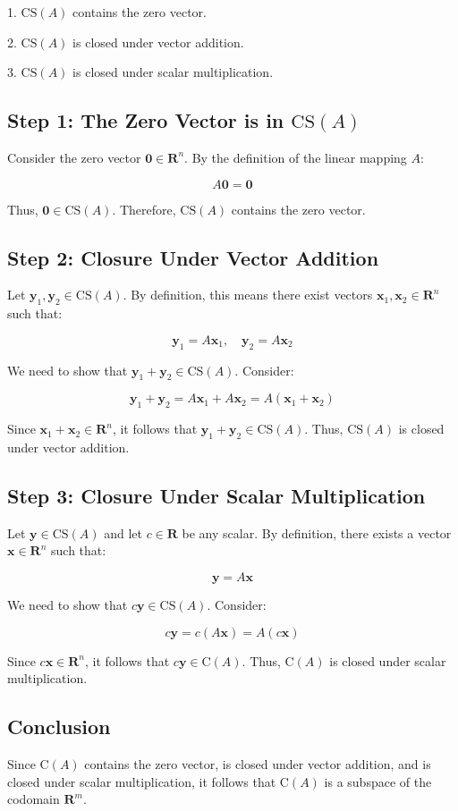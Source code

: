 \documentclass{article}
\begin{document}
1. \( \text{CS}(A) \) contains the zero vector.

2. \( \text{CS}(A) \) is closed under vector addition.

3. \( \text{CS}(A) \) is closed under scalar multiplication.

\subsection{Step 1: The Zero Vector is in \( \text{CS}(A) \)}

Consider the zero vector \( \mathbf{0} \in \mathbf{R}^n \). By the definition of the linear mapping \( A \):

\[
A \mathbf{0} = \mathbf{0}
\]

Thus, \( \mathbf{0} \in \text{CS}(A) \). Therefore, \( \text{CS}(A) \) contains the zero vector.

\subsection{Step 2: Closure Under Vector Addition}

Let \( \mathbf{y}_1, \mathbf{y}_2 \in \text{CS}(A) \). By definition, this means there exist vectors \( \mathbf{x}_1, \mathbf{x}_2 \in \mathbf{R}^n \) such that:

\[
\mathbf{y}_1 = A \mathbf{x}_1, \quad \mathbf{y}_2 = A \mathbf{x}_2
\]

We need to show that \( \mathbf{y}_1 + \mathbf{y}_2 \in \text{CS}(A) \). Consider:

\[
\mathbf{y}_1 + \mathbf{y}_2 = A \mathbf{x}_1 + A \mathbf{x}_2 = A(\mathbf{x}_1 + \mathbf{x}_2)
\]

Since \( \mathbf{x}_1 + \mathbf{x}_2 \in \mathbf{R}^n \), it follows that \( \mathbf{y}_1 + \mathbf{y}_2 \in \text{CS}(A) \). Thus, \( \text{CS}(A) \) is closed under vector addition.

\subsection{Step 3: Closure Under Scalar Multiplication}

Let \( \mathbf{y} \in \text{CS}(A) \) and let \( c \in \mathbf{R} \) be any scalar. By definition, there exists a vector \( \mathbf{x} \in \mathbf{R}^n \) such that:

\[
\mathbf{y} = A \mathbf{x}
\]

We need to show that \( c\mathbf{y} \in \text{CS}(A) \). Consider:

\[
c\mathbf{y} = c(A \mathbf{x}) = A(c\mathbf{x})
\]

Since \( c\mathbf{x} \in \mathbf{R}^n \), it follows that \( c\mathbf{y} \in \text{C}(A) \). Thus, \( \text{C}(A) \) is closed under scalar multiplication.

\subsection{Conclusion}

Since \( \text{C}(A) \) contains the zero vector, is closed under vector addition, and is closed under scalar multiplication, it follows that \( \text{C}(A) \) is a subspace of the codomain \( \mathbf{R}^m \).
\end{document}
